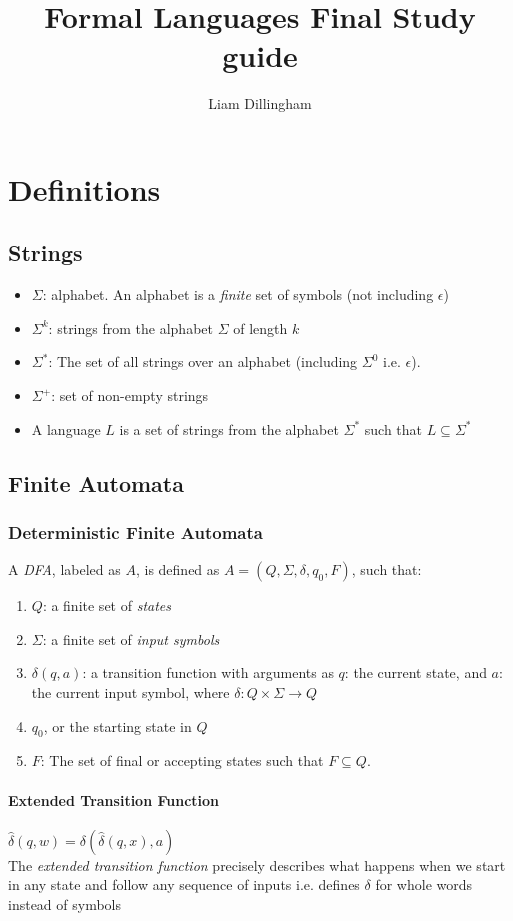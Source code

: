 \documentclass[20pt]{article} %
\title{Formal Languages Final Study guide}
\author{Liam Dillingham}
\begin{document}
\maketitle

\section{Definitions}
\subsection{Strings}
\begin{itemize}
\item $\Sigma$: alphabet.  An alphabet is a \textit{finite} set of symbols (not including $\epsilon$)
\item $\Sigma^{k}$: strings from the alphabet $\Sigma$ of length $k$
\item $\Sigma^{*}$: The set of all strings over an alphabet (including $\Sigma^{0}$ i.e. $\epsilon$).
\item $\Sigma^{+}$: set of non-empty strings
\item A language $L$ is a set of strings from the alphabet $\Sigma^{*}$ such that $L \subseteq \Sigma^{*}$
\end{itemize}
\subsection{Finite Automata}
\subsubsection{Deterministic Finite Automata}
A \textit{DFA}, labeled as $A$, is defined as $A = (Q, \Sigma, \delta, q_0, F)$, such that:
\begin{enumerate}
\item $Q$: a finite set of \textit{states}
\item $\Sigma$: a finite set of \textit{input symbols}
\item $\delta(q, a)$: a transition function with arguments as $q$: the current state, and $a$: the current input symbol, where $\delta: Q \times \Sigma \rightarrow Q$
\item $q_0$, or the starting state in $Q$
\item $F$: The set of final or accepting states such that $F \subseteq Q$.
\end{enumerate}
\paragraph{Extended Transition Function}  $\hat{\delta}(q,w) = \delta(\hat{\delta}(q,x), a)$\\
The \textit{extended transition function} precisely describes what happens when we start in any state and follow any sequence of inputs i.e. defines $\delta$ for whole words instead of symbols
\end{document}
